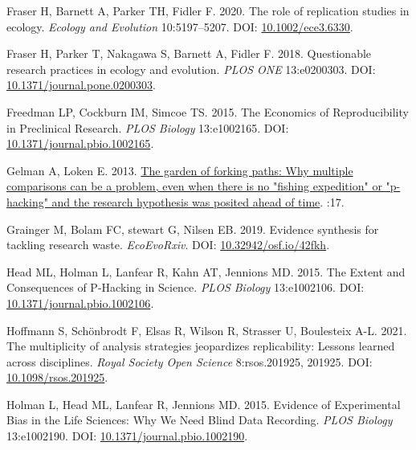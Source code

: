 \documentclass[10pt,a4paper]{article}
\newlength{\cslhangindent}
\newlength{\cslentryspacingunit} %
\newenvironment{CSLReferences}[2] %
 {%
  \setlength{\parindent}{0pt}
  \ifodd #1
  \let\oldpar\par
  \def\par{\hangindent=\cslhangindent\oldpar}
  \fi
  \setlength{\parskip}{#2\cslentryspacingunit}
 }%
 {}
\begin{document}
\begin{CSLReferences}{1}{0}
\leavevmode{}%
Fraser H, Barnett A, Parker TH, Fidler F. 2020. The role of replication studies in ecology. \emph{Ecology and Evolution} 10:5197--5207. DOI: \href{https://doi.org/10.1002/ece3.6330}{10.1002/ece3.6330}.

\leavevmode{}%
Fraser H, Parker T, Nakagawa S, Barnett A, Fidler F. 2018. Questionable research practices in ecology and evolution. \emph{PLOS ONE} 13:e0200303. DOI: \href{https://doi.org/10.1371/journal.pone.0200303}{10.1371/journal.pone.0200303}.

\leavevmode{}%
Freedman LP, Cockburn IM, Simcoe TS. 2015. The {Economics} of {Reproducibility} in {Preclinical} {Research}. \emph{PLOS Biology} 13:e1002165. DOI: \href{https://doi.org/10.1371/journal.pbio.1002165}{10.1371/journal.pbio.1002165}.

\leavevmode{}%
Gelman A, Loken E. 2013. \href{http://www.stat.columbia.edu/~gelman/research/unpublished/p_hacking.pdf}{The garden of forking paths: {Why} multiple comparisons can be a problem, even when there is no "fishing expedition" or "p-hacking" and the research hypothesis was posited ahead of time}. :17.

\leavevmode{}%
Grainger M, Bolam FC, stewart G, Nilsen EB. 2019. Evidence synthesis for tackling research waste. \emph{EcoEvoRxiv}. DOI: \href{https://doi.org/10.32942/osf.io/42fkh}{10.32942/osf.io/42fkh}.

\leavevmode{}%
Head ML, Holman L, Lanfear R, Kahn AT, Jennions MD. 2015. The {Extent} and {Consequences} of {P}-{Hacking} in {Science}. \emph{PLOS Biology} 13:e1002106. DOI: \href{https://doi.org/10.1371/journal.pbio.1002106}{10.1371/journal.pbio.1002106}.

\leavevmode{}%
Hoffmann S, Schönbrodt F, Elsas R, Wilson R, Strasser U, Boulesteix A-L. 2021. The multiplicity of analysis strategies jeopardizes replicability: Lessons learned across disciplines. \emph{Royal Society Open Science} 8:rsos.201925, 201925. DOI: \href{https://doi.org/10.1098/rsos.201925}{10.1098/rsos.201925}.

\leavevmode{}%
Holman L, Head ML, Lanfear R, Jennions MD. 2015. Evidence of {Experimental} {Bias} in the {Life} {Sciences}: {Why} {We} {Need} {Blind} {Data} {Recording}. \emph{PLOS Biology} 13:e1002190. DOI: \href{https://doi.org/10.1371/journal.pbio.1002190}{10.1371/journal.pbio.1002190}.


\end{CSLReferences}
\end{document}
